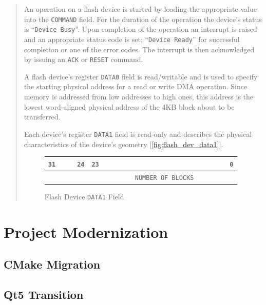 \documentclass[12pt,a4paper,openright,twoside]{report}
\begin{document}
\begin{quote}
	An operation on a flash device is started by loading the appropriate value into the \texttt{COMMAND} field. For the duration of the operation the device's status is ``\texttt{Device Busy}''.
	Upon completion of the operation an interrupt is raised and an appropriate status code is set; ``\texttt{Device Ready}'' for successful completion or one
	of the error codes.
	The interrupt is then acknowledged by issuing an \texttt{ACK} or \texttt{RESET} command.

	A flash device’s register \texttt{DATA0} field is read/writable and is used to specify the starting physical address for a read or write DMA operation.
	Since memory is addressed from low addresses to high ones, this address is the lowest word-aligned physical address of the 4KB block about to be transferred.

	Each device's register \texttt{DATA1} field is read-only and describes the physical characteristics of the device's geometry [\autoref{fig:flash_dev_data1}].
	\begin{figure}[h]
		\centering
		\begin{tabularx}{\textwidth}{XXXXXXXXXXXXXXXX}
			\texttt{31}                           &                  &                  & \multicolumn{1}{r}{\texttt{24}}       & \texttt{23} &  &  &  &  &                                               &  &  &  &  &                       & \multicolumn{1}{r}{\texttt{0}} \\ \hline
			\multicolumn{1}{|l}{\cellcolor{gray}} & \cellcolor{gray} & \cellcolor{gray} & \multicolumn{1}{l|}{\cellcolor{gray}} &             &  &  &  &  & \multicolumn{2}{l}{\texttt{NUMBER OF BLOCKS}} &  &  &  &  & \multicolumn{1}{l|}{}                                  \\ \hline
		\end{tabularx}
		\caption{Flash Device \texttt{DATA1} Field}
		\label{fig:flash_dev_data1}
	\end{figure}
\end{quote}

\chapter{Project Modernization}
\lhead[\fancyplain{}{\bfseries\thepage}]{\fancyplain{}{\bfseries\rightmark}}
\section{CMake Migration}
\section{Qt5 Transition}
\end{document}
